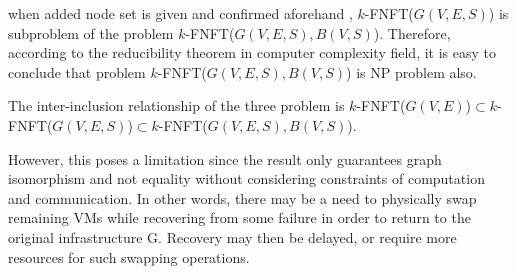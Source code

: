 when added node set is given and confirmed aforehand , $k$-FNFT($G(V,E,S)$) is subproblem of the problem $k$-FNFT($G(V,E,S),B(V,S)$). Therefore, according to  the  reducibility theorem\cite{cormen2009introduction} in computer complexity field, it is easy to conclude that problem $k$-FNFT($G(V,E,S),B(V,S)$) is NP problem also.

The inter-inclusion relationship of the three problem is $k$-FNFT($G(V,E)$)$\subset$$k$-FNFT($G(V,E,S)$)$\subset$$k$-FNFT($G(V,E,S),B(V,S)$).




However, this poses a limitation since the result only guarantees graph isomorphism and not equality without considering constraints of computation and communication. In other words, there may be a need to physically swap remaining VMs while recovering from some failure in order to return to the original infrastructure G. Recovery may then be delayed, or require more resources for such swapping operations.


